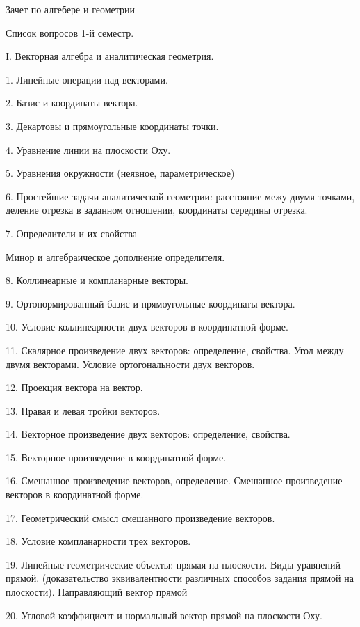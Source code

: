 \documentclass[a4paper]{article}
\begin{document}
    \begin{center}
        \LARGE{Зачет по алгебере и геометрии}
    \end{center}
    \newpage
    Список вопросов 1-й семестр.

    I. Векторная алгебра и аналитическая геометрия.

    1. Линейные операции над векторами.

    2. Базис и координаты вектора.

    3. Декартовы и прямоугольные координаты точки.

    4. Уравнение линии на плоскости Оху.

    5. Уравнения окружности (неявное, параметрическое)

    6. Простейшие задачи аналитической геометрии: расстояние межу двумя точками, деление отрезка в заданном отношении, координаты середины отрезка.

    7. Определители и их свойства

    Минор и алгебраическое дополнение определителя.

    8. Коллинеарные и компланарные векторы.

    9. Ортонормированный базис и прямоугольные координаты вектора.

    10. Условие коллинеарности двух векторов в координатной форме.

    11. Скалярное произведение двух векторов: определение, свойства. Угол между двумя векторами. Условие ортогональности двух векторов.

    12. Проекция вектора на вектор.

    13. Правая и левая тройки векторов.

    14. Векторное произведение двух векторов: определение, свойства.

    15. Векторное произведение в координатной форме.

    16. Смешанное произведение векторов, определение. Смешанное произведение векторов в координатной форме.

    17. Геометрический смысл смешанного произведение векторов.

    18. Условие компланарности трех векторов.

    19. Линейные геометрические объекты: прямая на плоскости.\newline
    Виды уравнений прямой. (доказательство эквивалентности различных способов задания прямой на плоскости). Направляющий вектор прямой

    20. Угловой коэффициент и нормальный вектор прямой на плоскости Оху.
\end{document}
